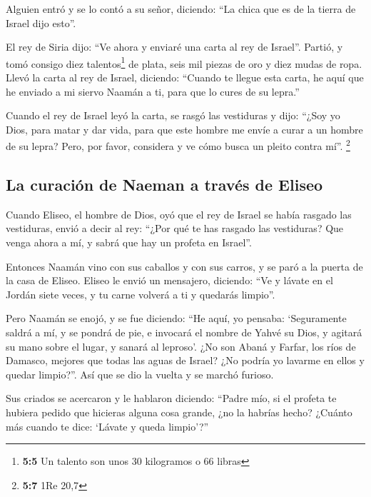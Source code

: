 \begin{paracol}{2}
 Alguien entró y se lo contó a su señor, diciendo: ``La
chica que es de la tierra de Israel dijo esto''.

 El rey de Siria dijo: ``Ve ahora y enviaré una carta al
rey de Israel''. Partió, y tomó consigo diez talentos\footnote{\textbf{5:5}
  Un talento son unos 30 kilogramos o 66 libras} de plata, seis mil
piezas de oro y diez mudas de ropa.  Llevó la carta al rey
de Israel, diciendo: ``Cuando te llegue esta carta, he aquí que he
enviado a mi siervo Naamán a ti, para que lo cures de su lepra.''

 Cuando el rey de Israel leyó la carta, se rasgó las
vestiduras y dijo: ``¿Soy yo Dios, para matar y dar vida, para que este
hombre me envíe a curar a un hombre de su lepra? Pero, por favor,
considera y ve cómo busca un pleito contra mí''. \footnote{\textbf{5:7}
  1Re 20,7}

\hypertarget{la-curaciuxf3n-de-naeman-a-travuxe9s-de-eliseo}{%
\subsection{La curación de Naeman a través de
Eliseo}\label{la-curaciuxf3n-de-naeman-a-travuxe9s-de-eliseo}}

 Cuando Eliseo, el hombre de Dios, oyó que el rey de
Israel se había rasgado las vestiduras, envió a decir al rey: ``¿Por qué
te has rasgado las vestiduras? Que venga ahora a mí, y sabrá que hay un
profeta en Israel''.

 Entonces Naamán vino con sus caballos y con sus carros, y
se paró a la puerta de la casa de Eliseo.  Eliseo le
envió un mensajero, diciendo: ``Ve y lávate en el Jordán siete veces, y
tu carne volverá a ti y quedarás limpio''.

 Pero Naamán se enojó, y se fue diciendo: ``He aquí, yo
pensaba: `Seguramente saldrá a mí, y se pondrá de pie, e invocará el
nombre de Yahvé su Dios, y agitará su mano sobre el lugar, y sanará al
leproso'.  ¿No son Abaná y Farfar, los ríos de Damasco,
mejores que todas las aguas de Israel? ¿No podría yo lavarme en ellos y
quedar limpio?''. Así que se dio la vuelta y se marchó furioso.

 Sus criados se acercaron y le hablaron diciendo: ``Padre
mío, si el profeta te hubiera pedido que hicieras alguna cosa grande,
¿no la habrías hecho? ¿Cuánto más cuando te dice: `Lávate y queda
limpio'?''


\end{paracol}
